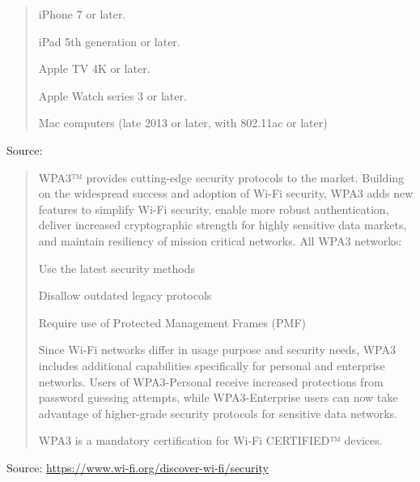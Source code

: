 \documentclass[Screen16to9,17pt]{foils}
\begin{document}


\begin{quote}
\begin{list2}
\item iPhone 7 or later.
\item iPad 5th generation or later.
\item Apple TV 4K or later.
\item Apple Watch series 3 or later.
\item Mac computers (late 2013 or later, with 802.11ac or later)
\end{list2}
\end{quote}
Source: 




\begin{quote}

WPA3™ provides cutting-edge security protocols to the market. Building on the widespread success and adoption of Wi-Fi security, WPA3 adds new features to simplify Wi-Fi security, enable more robust authentication, deliver increased cryptographic strength for highly sensitive data markets, and maintain resiliency of mission critical networks. All WPA3 networks:

\begin{list2}
\item Use the latest security methods
\item Disallow outdated legacy protocols
\item Require use of Protected Management Frames (PMF)
\end{list2}
Since Wi-Fi networks differ in usage purpose and security needs, WPA3 includes additional capabilities specifically for personal and enterprise networks. Users of WPA3-Personal receive increased protections from password guessing attempts, while WPA3-Enterprise users can now take advantage of higher-grade security protocols for sensitive data networks.

WPA3 is a mandatory certification for Wi-Fi CERTIFIED™ devices.
\end{quote}
Source: \url{https://www.wi-fi.org/discover-wi-fi/security}

\end{document}
